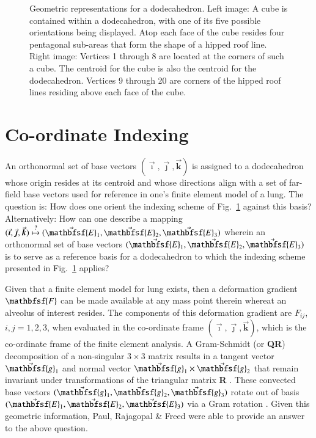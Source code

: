 \begin{figure}
{		\par}
	\caption{Geometric representations for a dodecahedron.  Left image:  A cube is contained within a dodecahedron, with one of its five possible orientations being displayed.  Atop each face of the cube resides four pentagonal sub-areas that form the shape of a hipped roof line.  Right image:  Vertices 1 through 8 are located at the corners of such a cube.  The centroid for the cube is also the centroid for the dodecahedron.  Vertices 9 through 20 are corners of the hipped roof lines residing above each face of the cube.}
	\label{figDodecahedron}
\end{figure}

\section{Co-ordinate Indexing}
\label{reindexing3D}

An orthonormal set of base vectors $( \vec{\boldsymbol{\imath}} , \vec{\boldsymbol{\jmath}} , \vec{\boldsymbol{k}} )$ is assigned to a dodecahedron whose origin resides at its centroid and whose directions align with a set of far-field base vectors used for reference in one's finite element model of a lung.  The question is: How does one orient the indexing scheme of Fig.~\ref{figDodecahedron} against this basis?  Alternatively:  How can one describe a mapping $( \vec{\boldsymbol{\imath}} , \vec{\boldsymbol{\jmath}} , \vec{\boldsymbol{k}} ) \overset{\text{?}}{\mapsto} ( \vec{\mathbfsf{E}}_1 , \vec{\mathbfsf{E}}_2 , \vec{\mathbfsf{E}}_3 )$ wherein an ortho\-normal set of base vectors $( \vec{\mathbfsf{E}}_1 , \vec{\mathbfsf{E}}_2 , \vec{\mathbfsf{E}}_3 )$ is to serve as a reference basis for a dodecahedron to which the indexing scheme presented in Fig.~\ref{figDodecahedron} applies?

Given that a finite element model for lung exists, then a deformation gradient $\mathbfsf{F}$ can be made available at any mass point therein whereat an alveolus of interest resides.  The components of this deformation gradient are $F_{ij}$, $i, j = 1,2,3$, when evaluated in the co-ordinate frame $( \vec{\boldsymbol{\imath}} , \vec{\boldsymbol{\jmath}} , \vec{\boldsymbol{k}} )$, which is the co-ordinate frame of the finite element analysis.  A Gram-Schmidt (or \textbf{QR}) decomposition of a non-singular $3 \! \times \! 3$ matrix results in a tangent vector $\vec{\mathbfsf{g}}_1$ and normal vector $\vec{\mathbfsf{g}}_1 \times \vec{\mathbfsf{g}}_2$ that remain invariant under transformations of the triangular matrix \textbf{R} \cite{McLellan80}.  These convected base vectors $( \vec{\mathbfsf{g}}_1 , \vec{\mathbfsf{g}}_2 , \vec{\mathbfsf{g}}_3 )$ rotate out of basis $( \vec{\mathbfsf{E}}_1 , \vec{\mathbfsf{E}}_2 , \vec{\mathbfsf{E}}_3 )$ via a Gram rotation \cite{FreedZamani18}.  Given this geometric information, Paul, Rajagopal \& Freed \cite{Pauletal20} were able to provide an answer to the above question.

